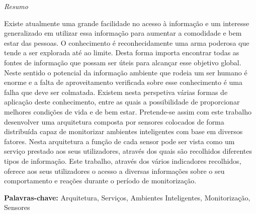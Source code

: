 \documentclass[a4paper, 12pt, oneside]{Thesis}  %
\begin{document}
\vspace*{\fill}

\newpage


\begin{center}
{\large \textit{Resumo} }
\end{center}


\vspace{0.5cm}
\quad Existe atualmente uma grande facilidade no acesso à informação e um interesse generalizado em utilizar essa informação para aumentar a comodidade e bem estar das pessoas. O conhecimento é reconhecidamente uma arma poderosa que tende a ser explorada até ao limite. Desta forma importa encontrar todas as fontes de informação que possam ser úteis para alcançar esse objetivo global. Neste sentido o potencial da informação ambiente que rodeia um ser humano é enorme e a falta de aproveitamento verificada sobre esse conhecimento é uma falha que deve ser colmatada. Existem nesta perspetiva várias formas de aplicação deste conhecimento, entre as quais a possibilidade de proporcionar melhores condições de vida e de bem estar. Pretende-se assim com este trabalho desenvolver uma arquitetura composta por sensores colocados de forma distribuída capaz de monitorizar ambientes inteligentes com base em diversos fatores. Nesta arquitetura a função de cada sensor pode ser vista como um serviço prestado aos seus utilizadores, através dos quais são recolhidos diferentes tipos de informação. Este trabalho, através dos vários indicadores recolhidos, oferece aos seus utilizadores o acesso a diversas informações sobre o seu comportamento e reações durante o período de monitorização.

\vspace{3cm}

\textbf{Palavras-chave:} Arquitetura, Serviços, Ambientes Inteligentes, Monitorização, Sensores




\newpage
\thispagestyle{empty}
\mbox{}


\newpage
\thispagestyle{empty}
\mbox{}
\end{document}
